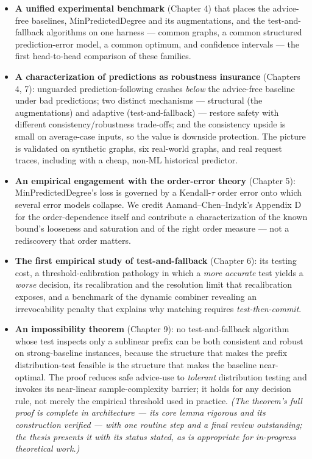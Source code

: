 \begin{itemize}
\item
  \textbf{A unified experimental benchmark} (Chapter 4) that places the advice-free baselines,
  MinPredictedDegree and its augmentations, and the test-and-fallback algorithms on one
  harness --- common graphs, a common structured prediction-error model, a common optimum, and
  confidence intervals --- the first head-to-head comparison of these families.
\item
  \textbf{A characterization of predictions as robustness insurance} (Chapters 4, 7): unguarded
  prediction-following crashes \emph{below} the advice-free baseline under bad predictions; two
  distinct mechanisms --- structural (the augmentations) and adaptive (test-and-fallback) ---
  restore safety with different consistency/robustness trade-offs; and the consistency
  upside is small on average-case inputs, so the value is downside protection. The picture
  is validated on synthetic graphs, six real-world graphs, and real request traces,
  including with a cheap, non-ML historical predictor.
\item
  \textbf{An empirical engagement with the order-error theory} (Chapter 5): MinPredictedDegree's
  loss is governed by a Kendall-\(\tau\) order error onto which several error models collapse.
  We credit Aamand--Chen--Indyk's Appendix D for the order-dependence itself and contribute a
  characterization of the known bound's looseness and saturation and of the right order
  measure --- not a rediscovery that order matters.
\item
  \textbf{The first empirical study of test-and-fallback} (Chapter 6): its testing cost, a
  threshold-calibration pathology in which a \emph{more accurate} test yields a \emph{worse} decision,
  its recalibration and the resolution limit that recalibration exposes, and a benchmark of
  the dynamic combiner revealing an irrevocability penalty that explains why matching
  requires \emph{test-then-commit}.
\item
  \textbf{An impossibility theorem} (Chapter 9): no test-and-fallback algorithm whose test
  inspects only a sublinear prefix can be both consistent and robust on strong-baseline
  instances, because the structure that makes the prefix distribution-test feasible is the
  structure that makes the baseline near-optimal. The proof reduces safe advice-use to
  \emph{tolerant} distribution testing and invokes its near-linear sample-complexity barrier;
  it holds for any decision rule, not merely the empirical threshold used in practice.
  \emph{(The theorem's full proof is complete in architecture --- its core lemma rigorous and its
  construction verified --- with one routine step and a final review outstanding; the thesis
  presents it with its status stated, as is appropriate for in-progress theoretical work.)}
\end{itemize}


